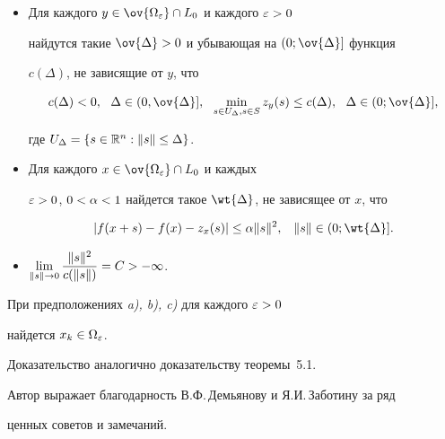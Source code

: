 \begin{itemize}


\item[a)] Для каждого $y \in \ov{\Omega_{\e}} \cap L_0$ и каждого $\varepsilon>0$


найдутся такие $\ov{\Delta}>0$ и убывающая на $(0; \ov{\Delta}]$ функция


$c(\Delta)$, не зависящие от $y$, что


$$


c(\Delta) <0, \ \ \Delta \in (0,\ov{\Delta}],


\ \ \min_{s \in U_{\Delta}, s \in S} z_y (s) \leq c(\Delta),


\ \ \Delta \in (0;\ov{\Delta}],


$$


где $U_{\Delta} = \{ s \in \Bbb R^n: \|s\| \leq \Delta \}$.


\item[b)] Для каждого $x \in \ov{\Omega_{\e}} \cap L_0$ и каждых


$\varepsilon>0$, $0<\alpha<1$ найдется такое $\wt{\Delta}$, не зависящее от $x$, что


$$


|f(x+s) - f(x) - z_x (s)| \leq \ga \|s\|^2,


\;\;\; \|s\| \in (0;\wt{\Delta}].


$$


\item[c)]


$\lim\limits_{\|s\| \rar 0}


\displaystyle{\frac{\|s\|^2}{c(\|s\|)}}=C > -\infty$.


\end{itemize}





\begin{thms} При предположениях {\em a), b), c)} для каждого $\varepsilon>0$


найдется $x_k \in \Omega_{\varepsilon}$.


\end{thms}





Доказательство аналогично доказательству теоремы~5.1.





Автор выражает благодарность В.Ф.\,Демьянову и Я.И.\,Заботину за ряд


ценных советов и замечаний.





